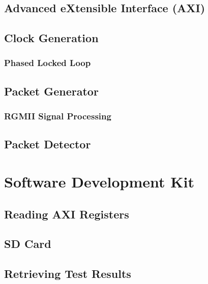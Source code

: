 \subsection{Advanced eXtensible Interface (AXI)}
\subsection{Clock Generation}
\subsubsection{Phased Locked Loop}
\subsection{Packet Generator}
\subsubsection{RGMII Signal Processing}
\subsection{Packet Detector}
\section{Software Development Kit}
\subsection{Reading AXI Registers}
\subsection{SD Card}
\subsection{Retrieving Test Results}
